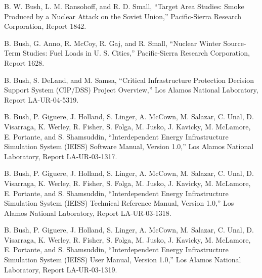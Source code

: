 \documentclass[]{article}
\begin{document}
B. W. Bush, L. M. Ransohoff, and R. D. Small, ``Target Area Studies:
Smoke Produced by a Nuclear Attack on the Soviet Union,'' Pacific-Sierra
Research Corporation, Report 1842.

B. Bush, G. Anno, R. McCoy, R. Gaj, and R. Small, ``Nuclear Winter
Source-Term Studies: Fuel Loads in U. S. Cities,'' Pacific-Sierra
Research Corporation, Report 1628.

B. Bush, S. DeLand, and M. Samsa, ``Critical Infrastructure Protection
Decision Support System (CIP/DSS) Project Overview,'' Los Alamos
National Laboratory, Report LA-UR-04-5319.

B. Bush, P. Giguere, J. Holland, S. Linger, A. McCown, M. Salazar, C.
Unal, D. Visarraga, K. Werley, R. Fisher, S. Folga, M. Jusko, J.
Kavicky, M. McLamore, E. Portante, and S. Shamsuddin, ``Interdependent
Energy Infrastructure Simulation System (IEISS) Software Manual, Version
1.0,'' Los Alamos National Laboratory, Report LA-UR-03-1317.

B. Bush, P. Giguere, J. Holland, S. Linger, A. McCown, M. Salazar, C.
Unal, D. Visarraga, K. Werley, R. Fisher, S. Folga, M. Jusko, J.
Kavicky, M. McLamore, E. Portante, and S. Shamsuddin, ``Interdependent
Energy Infrastructure Simulation System (IEISS) Technical Reference
Manual, Version 1.0,'' Los Alamos National Laboratory, Report
LA-UR-03-1318.

B. Bush, P. Giguere, J. Holland, S. Linger, A. McCown, M. Salazar, C.
Unal, D. Visarraga, K. Werley, R. Fisher, S. Folga, M. Jusko, J.
Kavicky, M. McLamore, E. Portante, and S. Shamsuddin, ``Interdependent
Energy Infrastructure Simulation System (IEISS) User Manual, Version
1.0,'' Los Alamos National Laboratory, Report LA-UR-03-1319.
\end{document}
